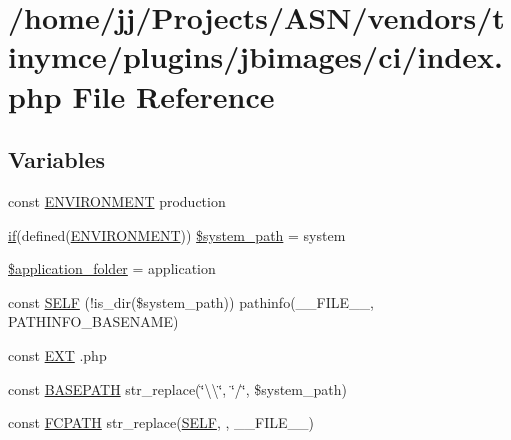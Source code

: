 \hypertarget{vendors_2tinymce_2plugins_2jbimages_2ci_2index_8php}{}\section{/home/jj/\+Projects/\+A\+S\+N/vendors/tinymce/plugins/jbimages/ci/index.php File Reference}
\label{vendors_2tinymce_2plugins_2jbimages_2ci_2index_8php}
\subsection*{Variables}
\begin{DoxyCompactItemize}
\item 
const \hyperlink{vendors_2tinymce_2plugins_2jbimages_2ci_2index_8php_a8757a57d09df5349f8b93b2083e29a1e}{E\+N\+V\+I\+R\+O\+N\+M\+E\+NT} \textquotesingle{}production\textquotesingle{}
\item 
\hyperlink{jquery_8tokeninput_8js_ad8dd46a3cbc004569e34401e9e71771a}{if}(defined(\textquotesingle{}\hyperlink{vendors_2tinymce_2plugins_2jbimages_2ci_2index_8php_a8757a57d09df5349f8b93b2083e29a1e}{E\+N\+V\+I\+R\+O\+N\+M\+E\+NT}\textquotesingle{})) \hyperlink{vendors_2tinymce_2plugins_2jbimages_2ci_2index_8php_ae873e5430c828eb3081abe7050a379b6}{\$system\+\_\+path} = \textquotesingle{}system\textquotesingle{}
\item 
\hyperlink{vendors_2tinymce_2plugins_2jbimages_2ci_2index_8php_ace4309eda0b92e3260b226079bc17909}{\$application\+\_\+folder} = \textquotesingle{}application\textquotesingle{}
\item 
const \hyperlink{vendors_2tinymce_2plugins_2jbimages_2ci_2index_8php_a428c045e64680e1582ba74161e441a1c}{S\+E\+LF} (!is\+\_\+dir(\$system\+\_\+path)) pathinfo(\+\_\+\+\_\+\+F\+I\+L\+E\+\_\+\+\_\+, P\+A\+T\+H\+I\+N\+F\+O\+\_\+\+B\+A\+S\+E\+N\+A\+ME)
\item 
const \hyperlink{vendors_2tinymce_2plugins_2jbimages_2ci_2index_8php_ad48706cc82e010be85f1398fb34c6510}{E\+XT} \textquotesingle{}.php\textquotesingle{}
\item 
const \hyperlink{vendors_2tinymce_2plugins_2jbimages_2ci_2index_8php_ad39801cabfd338dc5524466fe793fda9}{B\+A\+S\+E\+P\+A\+TH} str\+\_\+replace(\char`\"{}\textbackslash{}\textbackslash{}\char`\"{}, \char`\"{}/\char`\"{}, \$system\+\_\+path)
\item 
const \hyperlink{vendors_2tinymce_2plugins_2jbimages_2ci_2index_8php_ae486546e58b2603595efedf9f95b3926}{F\+C\+P\+A\+TH} str\+\_\+replace(\hyperlink{vendors_2tinymce_2plugins_2jbimages_2ci_2index_8php_a428c045e64680e1582ba74161e441a1c}{S\+E\+LF}, \textquotesingle{}\textquotesingle{}, \+\_\+\+\_\+\+F\+I\+L\+E\+\_\+\+\_\+)

\end{DoxyCompactItemize}
